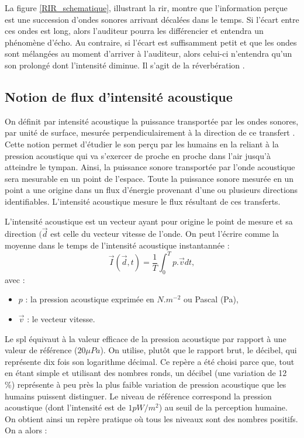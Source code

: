 La figure \ref{RIR_schematique}, illustrant la \gls{rir}, montre que l'information perçue est une succession d'ondes sonores arrivant décalées dans le temps. Si l'écart entre ces ondes est long, alors l'auditeur pourra les différencier et entendra un phénomène d'écho. Au contraire, si l'écart est suffisamment petit et que les ondes sont mélangées au moment d'arriver à l'auditeur, alors celui-ci n'entendra qu'un son prolongé dont l'intensité diminue. Il s'agit de la réverbération \cite[p. 39]{sabine}. 





\subsection{Notion de flux d'intensité acoustique} \label{sect_intensite}
On définit par intensité acoustique la puissance transportée par les ondes sonores, par unité de surface, mesurée perpendiculairement à la direction de ce transfert \cite[IEC 60050]{cei}. Cette notion permet d'étudier le son perçu par les humains en la reliant à la pression acoustique qui va s'exercer de proche en proche dans l'air jusqu'à atteindre le tympan. Ainsi, la puissance sonore transportée par l'onde acoustique sera mesurable en un point de l'espace. Toute la puissance sonore mesurée en un point a une origine dans un flux d'énergie provenant d'une ou plusieurs directions identifiables. L'intensité acoustique mesure le flux résultant de ces transferts. 

L'intensité acoustique est un vecteur ayant pour origine le point de mesure et sa direction $(\overrightarrow{d}$ est celle du vecteur vitesse de l'onde. On peut l'écrire comme la moyenne dans le temps de l'intensité acoustique instantannée :
\begin{equation} 
\overrightarrow{I}(\overrightarrow{d},t) = \frac{1}{T} \int^T_0 p.\overrightarrow{v}dt,
\end{equation}
avec : 
\begin{itemize}
\item $p$ : la pression acoustique exprimée en $N.m^{-2}$ ou Pascal (Pa),
\item $\overrightarrow{v}$  : le vecteur vitesse.
\end{itemize}

Le \gls{spl} équivaut à la valeur efficace de la pression acoustique par rapport à une valeur de référence ($20 \mu Pa$). On utilise, plutôt que le rapport brut, le décibel, qui représente dix fois son logarithme décimal. Ce repère a été choisi parce que, tout en étant simple et utilisant des nombres ronds, un décibel (une variation de 12 \%) représente à peu près la plus faible variation de pression acoustique que les humains puissent distinguer. Le niveau de référence correspond la pression acoustique (dont l'intensité est de $1 pW/m^2$) au seuil de la perception humaine. On obtient ainsi un repère pratique où tous les niveaux sont des nombres positifs. On a alors :

